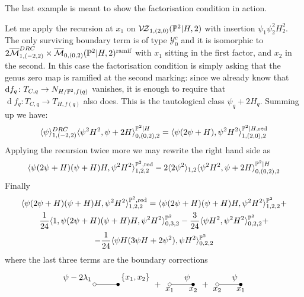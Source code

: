 The last example is meant to show the factorisation condition in action.
\begin{ex}
 Let me apply the recursion at $x_1$ on $\mathcal{V\!Z}_{1,(2,0)}(\mathbb P^2|H,2)$ with insertion $\psi_1\psi_2^2H_2^2$. The only surviving boundary term is of type $\mathcal Y^c_0$ and it is isomorphic to $2\overline{\mathcal{M}}^{DRC}_{1,(-2,2)}\times\overline{\mathcal{M}}_{0,(0,2)}(\mathbb P^2|H,2)^{\rm{ramif}}$ with $x_1$ sitting in the first factor, and $x_2$ in the second. In this case the factorisation condition is simply asking that the genus zero map is ramified at the second marking: since we already know that $\operatorname{d}\! f_q\colon T_{C,q}\rightarrow N_{H/\mathbb P^2,f(q)}$ vanishes, it is enough to require that $\operatorname{d}\! f_q\colon T_{C,q}\to T_{H,f(q)}$ also does. This is the tautological class $\psi_q+2H_q$. Summing up we have:
 \[\langle\psi\rangle^{DRC}_{1,(-2,2)}\langle\psi^2H^2,\psi+2H\rangle^{\mathbb P^2|H}_{0,(0,2),2}=\langle\psi(2\psi+H),\psi^2H^2\rangle^{\mathbb P^2|H,\rm{red}}_{1,(2,0),2}\]
 Applying the recursion twice more we may rewrite the right hand side as
 \[\langle\psi(2\psi+H)(\psi+H)H,\psi^2H^2\rangle^{\mathbb P^2,\rm{red}}_{1,2,2}-2\langle2\psi^2\rangle_{1,2}\langle\psi^2H^2,\psi+2H\rangle^{\mathbb P^2|H}_{0,(0,2),2}\]
 Finally
\begin{multline*}
 \langle\psi(2\psi+H)(\psi+H)H,\psi^2H^2\rangle^{\mathbb P^2,\rm{red}}_{1,2,2}=\langle\psi(2\psi+H)(\psi+H)H,\psi^2H^2\rangle^{\mathbb P^2}_{1,2,2}+\\ \frac{1}{24}\langle1,\psi(2\psi+H)(\psi+H)H,\psi^2H^2\rangle^{\mathbb P^2}_{0,3,2}-\frac{3}{24}\langle\psi H^2,\psi^2H^2\rangle^{\mathbb P^2}_{0,2,2}+\\
 -\frac{1}{24}\langle\psi H(3\psi H+2\psi^2),\psi H^2\rangle^{\mathbb P^2}_{0,2,2}
\end{multline*}
where the last three terms are the boundary corrections \[{\tikz[baseline=-3pt]{
\draw (0,0)node[above left]{$\psi-2\lambda_1$} -- (1,0)node[above right]{$\{x_1,x_2\}$};
\draw (0,0) circle(2pt)[fill=white];
\fill (1,0) circle (2pt)}
}+ {\tikz[baseline=-3pt]{
\draw (0,0)node[below]{$x_1$} -- node[above right]{$\psi$}(1,0)node[below]{$x_2$};
\draw (0,0) circle(2pt)[fill=white];
\fill (1,0) circle (2pt)}
}+ {\tikz[baseline=-3pt]{
\draw (0,0)node[below]{$x_2$} -- node[above right]{$\psi$}(1,0)node[below]{$x_1$};
\draw (0,0) circle(2pt)[fill=white];
\fill (1,0) circle (2pt)}
}
\]
\end{ex}
